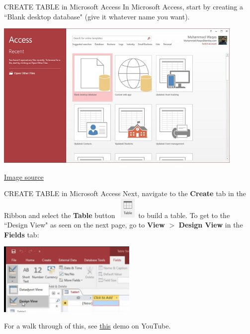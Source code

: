 \documentclass[xcolor=svgnames]{beamer}
\theoremstyle{example}
\begin{document}
\begin{frame}{CREATE TABLE in Microsoft Access}
In Microsoft Access, start by  creating a ``Blank desktop database" (give it whatever name you want).\\
\begin{center}
\includegraphics[width=0.9\textwidth]{img/blankDatabase.jpg}
\end{center}
\href{https://www.tutorialspoint.com/ms_access/ms_access_create_database.htm}{Image source}
\end{frame}


\begin{frame}{CREATE TABLE in Microsoft Access}
Next,  navigate to the {\bf Create} tab in the Ribbon and select the {\bf Table} button \ \includegraphics[width=2em]{img/create_tab.png}\  to build a table.  To get to the ``Design View" as seen on the next page, go to {\bf View} $>$ {\bf Design View} in the {\bf Fields} tab:
\\
\begin{center}
\includegraphics[width=0.5\textwidth]{img/designView}
\end{center}
For a walk through of this, see \href{https://www.youtube.com/watch?v=PBhftKTmdHI}{this} demo on YouTube.
\end{frame}
\end{document}
